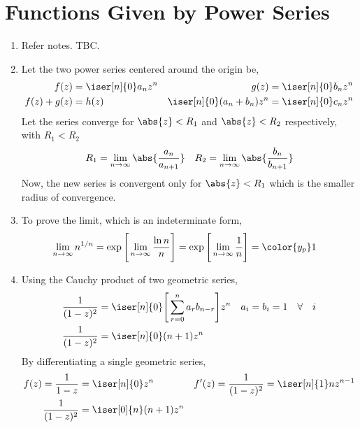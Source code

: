 \section{Functions Given by Power Series}

\begin{enumerate}
    \item Refer notes. TBC.

    \item Let the two power series centered around the origin be,
          \begin{align}
              f(z)                        & = \iser[n]{0} a_n z^n &
              g(z)                        & = \iser[n]{0} b_n z^n   \\
              f(z) + g(z)                 & = h(z)                &
              \iser[n]{0} (a_n + b_n) z^n & = \iser[n]{0} c_n z^n
          \end{align}
          Let the series converge for $ \abs{z} < R_1 $ and $ \abs{z} < R_2 $
          respectively, with $ R_1 < R_2 $
          \begin{align}
              R_1 & = \lim_{n \to \infty} \abs{\frac{a_n}{a_{n+1}}} &
              R_2 & = \lim_{n \to \infty} \abs{\frac{b_n}{b_{n+1}}}   \\
          \end{align}
          Now, the new series is convergent only for $ \abs{z} < R_1 $ which is the
          smaller radius of convergence.

    \item To prove the limit, which is an indeterminate form,
          \begin{align}
              \lim_{n \to \infty} n^{1/n} & = \exp\Bigg[ \lim_{n \to \infty}
                  \frac{\ln n}{n} \Bigg]
              = \exp\Bigg[ \lim_{n \to \infty}
                  \frac{1}{n} \Bigg] = \color{y_p} 1
          \end{align}

    \item Using the Cauchy product of two geometric series,
          \begin{align}
              \frac{1}{(1-z)^2} & = \iser[n]{0} \Bigg[\sum_{r=0}^{n} a_r b_{n-r}
              \Bigg] z^n        &
              a_i = b_i         & = 1 \quad \forall \quad i                      \\
              \frac{1}{(1-z)^2} & = \iser[n]{0} (n+1) z^n
          \end{align}
          By differentiating a single geometric series,
          \begin{align}
              f(z) = \frac{1}{1-z}      & = \iser[n]{0} z^n      &
              f'(z) = \frac{1}{(1-z)^2} & = \iser[n]{1} nz^{n-1}   \\
              \frac{1}{(1-z)^2}         & = \iser[0]{n} (n+1)z^n
          \end{align}


\end{enumerate}
